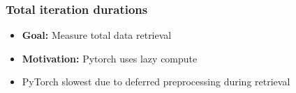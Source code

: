 \documentclass[t,english]{beamer}
\begin{document}
\begin{frame}
  \frametitle{Total iteration durations}
  \begin{itemize}
    \item<1-> \textbf{Goal:} Measure total data retrieval
    \item<2-> \textbf{Motivation:} Pytorch uses lazy compute
  \end{itemize}
  \begin{itemize}
    \item<4->  PyTorch slowest due to deferred preprocessing during retrieval
  \end{itemize}
\end{frame}
\end{document}
